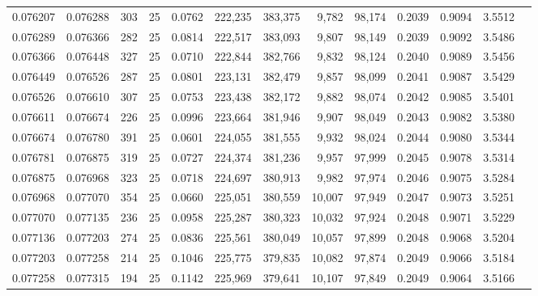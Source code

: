 \begin{tabular}{rrrrrrrrrrrrr}
0.076207 & 0.076288 &   303 &  25 &                                     0.0762 & 222,235 & 383,375 &   9,782 &  98,174 & 0.2039 & 0.9094 & 3.5512 \\
0.076289 & 0.076366 &   282 &  25 &                                     0.0814 & 222,517 & 383,093 &   9,807 &  98,149 & 0.2039 & 0.9092 & 3.5486 \\
0.076366 & 0.076448 &   327 &  25 &                                     0.0710 & 222,844 & 382,766 &   9,832 &  98,124 & 0.2040 & 0.9089 & 3.5456 \\
0.076449 & 0.076526 &   287 &  25 &                                     0.0801 & 223,131 & 382,479 &   9,857 &  98,099 & 0.2041 & 0.9087 & 3.5429 \\
0.076526 & 0.076610 &   307 &  25 &                                     0.0753 & 223,438 & 382,172 &   9,882 &  98,074 & 0.2042 & 0.9085 & 3.5401 \\
0.076611 & 0.076674 &   226 &  25 &                                     0.0996 & 223,664 & 381,946 &   9,907 &  98,049 & 0.2043 & 0.9082 & 3.5380 \\
0.076674 & 0.076780 &   391 &  25 &                                     0.0601 & 224,055 & 381,555 &   9,932 &  98,024 & 0.2044 & 0.9080 & 3.5344 \\
0.076781 & 0.076875 &   319 &  25 &                                     0.0727 & 224,374 & 381,236 &   9,957 &  97,999 & 0.2045 & 0.9078 & 3.5314 \\
0.076875 & 0.076968 &   323 &  25 &                                     0.0718 & 224,697 & 380,913 &   9,982 &  97,974 & 0.2046 & 0.9075 & 3.5284 \\
0.076968 & 0.077070 &   354 &  25 &                                     0.0660 & 225,051 & 380,559 &  10,007 &  97,949 & 0.2047 & 0.9073 & 3.5251 \\
0.077070 & 0.077135 &   236 &  25 &                                     0.0958 & 225,287 & 380,323 &  10,032 &  97,924 & 0.2048 & 0.9071 & 3.5229 \\
0.077136 & 0.077203 &   274 &  25 &                                     0.0836 & 225,561 & 380,049 &  10,057 &  97,899 & 0.2048 & 0.9068 & 3.5204 \\
0.077203 & 0.077258 &   214 &  25 &                                     0.1046 & 225,775 & 379,835 &  10,082 &  97,874 & 0.2049 & 0.9066 & 3.5184 \\
0.077258 & 0.077315 &   194 &  25 &                                     0.1142 & 225,969 & 379,641 &  10,107 &  97,849 & 0.2049 & 0.9064 & 3.5166 \\

\end{tabular}
